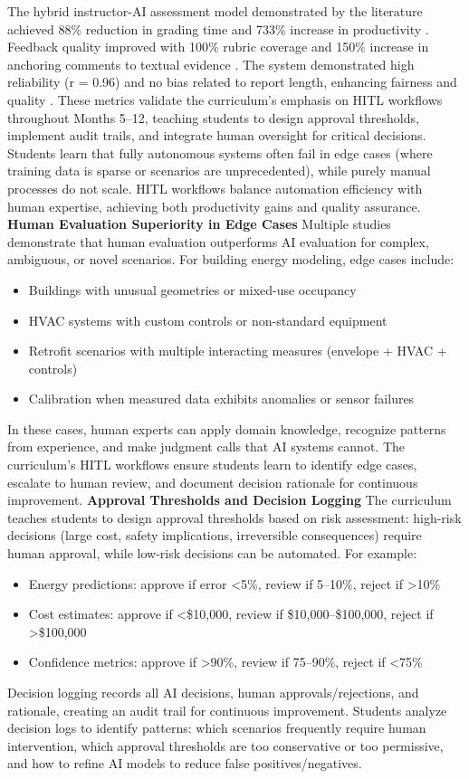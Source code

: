 \documentclass[12pt,a4paper]{article}
\begin{document}
The hybrid instructor-AI assessment model demonstrated by the literature achieved 88\% reduction in grading time and 733\% increase in productivity \cite{ref19}. Feedback quality improved with 100\% rubric coverage and 150\% increase in anchoring comments to textual evidence \cite{ref19}. The system demonstrated high reliability (r = 0.96) and no bias related to report length, enhancing fairness and quality \cite{ref19}.
These metrics validate the curriculum's emphasis on HITL workflows throughout Months 5--12, teaching students to design approval thresholds, implement audit trails, and integrate human oversight for critical decisions. Students learn that fully autonomous systems often fail in edge cases (where training data is sparse or scenarios are unprecedented), while purely manual processes do not scale. HITL workflows balance automation efficiency with human expertise, achieving both productivity gains and quality assurance.
\textbf{Human Evaluation Superiority in Edge Cases}
Multiple studies demonstrate that human evaluation outperforms AI evaluation for complex, ambiguous, or novel scenarios. For building energy modeling, edge cases include:
\begin{itemize}
  \item Buildings with unusual geometries or mixed-use occupancy
  \item HVAC systems with custom controls or non-standard equipment
  \item Retrofit scenarios with multiple interacting measures (envelope + HVAC + controls)
  \item Calibration when measured data exhibits anomalies or sensor failures
\end{itemize}
In these cases, human experts can apply domain knowledge, recognize patterns from experience, and make judgment calls that AI systems cannot. The curriculum's HITL workflows ensure students learn to identify edge cases, escalate to human review, and document decision rationale for continuous improvement.
\textbf{Approval Thresholds and Decision Logging}
The curriculum teaches students to design approval thresholds based on risk assessment: high-risk decisions (large cost, safety implications, irreversible consequences) require human approval, while low-risk decisions can be automated. For example:
\begin{itemize}
  \item Energy predictions: approve if error <5\%, review if 5--10\%, reject if >10\%
  \item Cost estimates: approve if <\$10,000, review if \$10,000--\$100,000, reject if >\$100,000
  \item Confidence metrics: approve if >90\%, review if 75--90\%, reject if <75\%
\end{itemize}
Decision logging records all AI decisions, human approvals/rejections, and rationale, creating an audit trail for continuous improvement. Students analyze decision logs to identify patterns: which scenarios frequently require human intervention, which approval thresholds are too conservative or too permissive, and how to refine AI models to reduce false positives/negatives.
\end{document}
